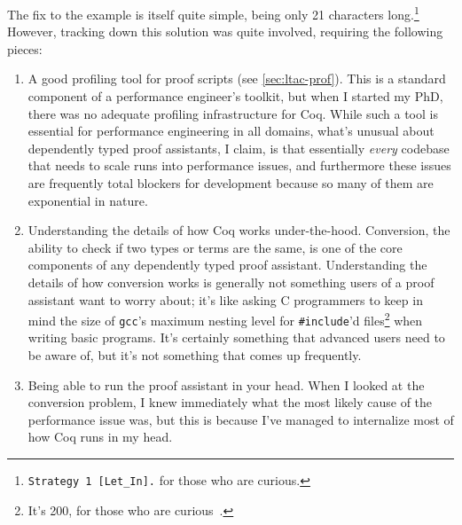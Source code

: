 The fix to the example is itself quite simple, being only 21 characters long.\footnote{\texttt{Strategy 1 [Let\_In].} for those who are curious.}
However, tracking down this solution was quite involved, requiring the following pieces:
\begin{enumerate}
  \item
    A good profiling tool for proof scripts (see \autoref{sec:ltac-prof}).
    This is a standard component of a performance engineer's toolkit, but when I started my PhD, there was no adequate profiling infrastructure for Coq.
    While such a tool is essential for performance engineering in all domains, what's unusual about dependently typed proof assistants, I claim, is that essentially \emph{every} codebase that needs to scale runs into performance issues, and furthermore these issues are frequently total blockers for development because so many of them are exponential in nature.
  \item
    Understanding the details of how Coq works under-the-hood.
    Conversion, the ability to check if two types or terms are the same, is one of the core components of any dependently typed proof assistant.
    Understanding the details of how conversion works is generally not something users of a proof assistant want to worry about; it's like asking C programmers to keep in mind the size of \texttt{gcc}'s maximum nesting level for \texttt{\#include}'d files\footnote{It's 200, for those who are curious~\cite{C2017FSF}.} when writing basic programs.
    It's certainly something that advanced users need to be aware of, but it's not something that comes up frequently.
  \item
    Being able to run the proof assistant in your head.
    When I looked at the conversion problem, I knew immediately what the most likely cause of the performance issue was, but this is because I've managed to internalize most of how Coq runs in my head.


\end{enumerate}
